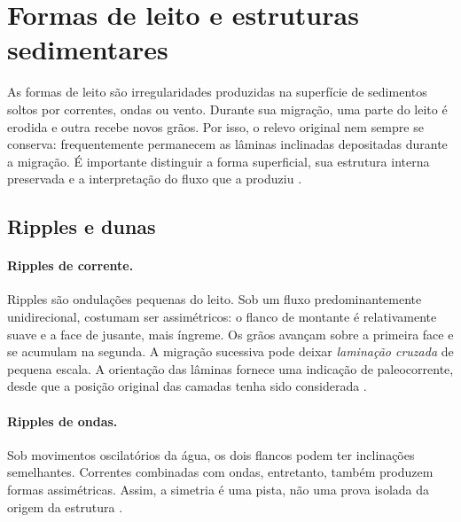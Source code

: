 
\section{Formas de leito e estruturas sedimentares}

As formas de leito são irregularidades produzidas na superfície de sedimentos
soltos por correntes, ondas ou vento. Durante sua migração, uma parte do leito
é erodida e outra recebe novos grãos. Por isso, o relevo original nem sempre
se conserva: frequentemente permanecem as lâminas inclinadas depositadas
durante a migração. É importante distinguir a forma superficial, sua estrutura
interna preservada e a interpretação do fluxo que a produziu
\autocite{southard2006bedforms,southard2006cross}.

\subsection{Ripples e dunas}

\paragraph{Ripples de corrente.}
Ripples são ondulações pequenas do leito. Sob um fluxo predominantemente
unidirecional, costumam ser assimétricos: o flanco de montante é relativamente
suave e a face de jusante, mais íngreme. Os grãos avançam sobre a primeira
face e se acumulam na segunda. A migração sucessiva pode deixar
\emph{laminação cruzada} de pequena escala. A orientação das lâminas fornece
uma indicação de paleocorrente, desde que a posição original das camadas
tenha sido considerada \autocite{southard2006cross}.

\paragraph{Ripples de ondas.}
Sob movimentos oscilatórios da água, os dois flancos podem ter inclinações
semelhantes. Correntes combinadas com ondas, entretanto, também produzem
formas assimétricas. Assim, a simetria é uma pista, não uma prova isolada da
origem da estrutura \autocite{southard2006bedforms}.

